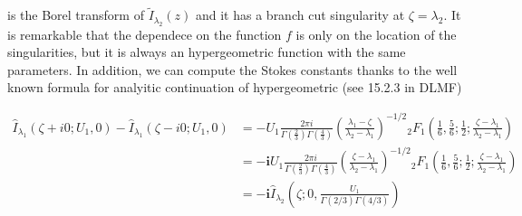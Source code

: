 \documentclass[11pt,a4paper,twoside,leqno,noamsfonts]{amsart}
\numberwithin{equation}{section}
\begin{document}
is the Borel transform of $\tilde{I}_{\lambda_2}(z)$ and it has a branch cut singularity at $\zeta=\lambda_2$. It is remarkable that  the dependece on the function $f$ is only on the location of the singularities, but it is always an hypergeometric function with the same parameters. In addition, we can compute the Stokes constants thanks to the well known formula for analyitic continuation of hypergeometric (see 15.2.3 in DLMF) 

\begin{align*}
\hat{I}_{\lambda_1}(\zeta+i0;U_1,0)-\hat{I}_{\lambda_1}(\zeta-i0;U_1,0)&=-U_1\frac{2\pi i}{\Gamma\left(\frac{2}{3}\right)\Gamma\left(\frac{4}{3}\right)}\left(\frac{\lambda_1-\zeta}{\lambda_2-\lambda_1}\right)^{-1/2}{}_2F_1\left(\frac{1}{6},\frac{5}{6};\frac{1}{2};\frac{\zeta-\lambda_1}{\lambda_2-\lambda_1}\right)\\
&=\mathbf{-i}U_1\frac{2\pi i}{\Gamma\left(\frac{2}{3}\right)\Gamma\left(\frac{4}{3}\right)}\left(\frac{\zeta-\lambda_1}{\lambda_2-\lambda_1}\right)^{-1/2}{}_2F_1\left(\frac{1}{6},\frac{5}{6};\frac{1}{2};\frac{\zeta-\lambda_1}{\lambda_2-\lambda_1}\right)\\
&=\mathbf{-i} \hat{I}_{\lambda_2}\left(\zeta;0,\frac{U_1}{\Gamma(2/3)\Gamma(4/3)}\right)
\end{align*}
    
\end{document}
